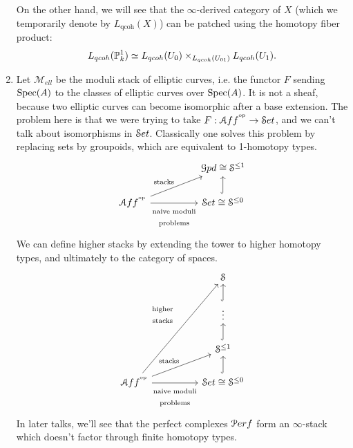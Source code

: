 \documentclass[10pt,a4paper,reqno,oneside]{book} %
\theoremstyle{plain}
\theoremstyle{definition}
\theoremstyle{remark}
\numberwithin{equation}{section}
\begin{document}
\begin{enumerate}
On the other hand, we will see that the $\infty$-derived category of $X$ (which we temporarily 
denote by $L_{\text{qcoh}}(X)$) can be patched using the homotopy fiber product:
\[	L_{qcoh}(\mathbb P^1_k) \simeq  L_{qcoh}(U_0) \times_{L_{qcoh}(U_{01})} L_{qcoh}(U_1) .\]

\item Let $\mathcal{M}_{ell}$ be the moduli stack of elliptic curves, i.e. the functor $F$ sending
$\operatorname{Spec}(A)$ to the classes of elliptic curves over $\operatorname{Spec}(A)$. It is not a sheaf, because two elliptic curves can become
isomorphic after a base extension. The problem here is that we were trying to take $F : \mathcal A ff^{^\mathrm{op}} \to \mathcal S et$, and we can't talk
about isomorphisms in $\mathcal S et$. Classically one solves this problem by replacing sets by groupoids, which are equivalent to
1-homotopy types.
\[
\begin{tikzcd}
\; & & \cG pd \cong \cS^{\leq 1} \\
\cA ff^{\op}\arrow{urr}{\text{stacks}}\arrow[swap]{rr}{\begin{array}{c}\text{naive moduli}\\
\text{problems}\end{array}} & & \cS et \cong \cS^{\leq 0}\arrow[hook]{u}
\end{tikzcd}
\]
We can define higher stacks by extending the tower to higher homotopy types, and ultimately to the category of spaces.
\[
\begin{tikzcd}
\; & &  \cS \\
\; & &  \vdots\arrow[hook]{u} \\
\; & &  \cS^{\leq 1}\arrow[hook]{u} \\
\cA ff^{\op}\arrow{uuurr}{\begin{array}{c}\text{higher}\\\text{stacks}\end{array}}
\arrow{urr}{\text{stacks}}\arrow[swap]{rr}{\begin{array}{c}\text{naive moduli}\\\text{problems}\end{array}} & & 
\cS et \cong \cS^{\leq 0}\arrow[hook]{u}
\end{tikzcd}
\]
In later talks, we'll
see that the perfect complexes $\mathcal P erf$ form an $\infty$-stack which doesn't factor through finite homotopy types.
\end{enumerate}
\end{document}
